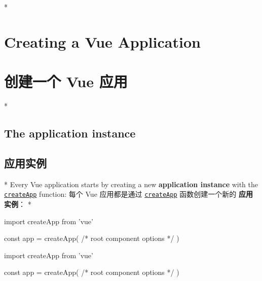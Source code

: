 \begin{paracol}{2}
\switchcolumn[0]*%
\section{Creating a Vue Application}
\switchcolumn
\section{创建一个 Vue 应用}
\switchcolumn[0]*%
\subsection{The application instance}
\switchcolumn
\subsection{应用实例}
\switchcolumn[0]*%
Every Vue application starts by creating a new \textbf{application
instance} with the
\href{https://vuejs.org/api/application.html\#createapp}{\texttt{createApp}}
function:
\switchcolumn
每个 Vue 应用都是通过
\href{https://cn.vuejs.org/api/application.html\#createapp}{\texttt{createApp}}
函数创建一个新的 \textbf{应用实例}：
\switchcolumn[0]*%
\begin{codeJs}
import { createApp } from 'vue'

const app = createApp({
    /* root component options */
})
\end{codeJs}
\switchcolumn
\begin{codeJs}
import { createApp } from 'vue'

const app = createApp({
    /* root component options */
})
\end{codeJs}
\end{paracol}
